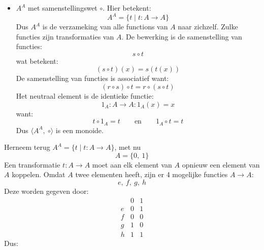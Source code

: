 \begin{itemize}
    \item $A^A$ met samenstellingswet $\circ$. Hier betekent:
    \begin{equation*}
        A^A = \{t \mid t : A \to A\}
    \end{equation*}
    Dus $A^A$ is de verzameking van alle functions van $A$ naar zichzelf. Zulke functies zijn transformaties van $A$. De bewerking is de samenstelling van functies:
    \begin{equation*}
        s \circ t
    \end{equation*}
    wat betekent:
    \begin{equation*}
        (s \circ t)(x) = s(t(x))
    \end{equation*}
    De samenstelling van functies is associatief want:
    \begin{equation*}
        (r \circ s) \circ t = r \circ (s \circ t)
    \end{equation*}
    Het neutraal element is de identieke functie:
    \begin{equation*}
        1_A : A \to A : 1_A(x) = x
    \end{equation*}
    want:
    \begin{equation*}
        t \circ 1_A = t \qquad \text{en} \qquad 1_A \circ t = t
    \end{equation*}
    Dus $\langle A^A,\ \circ \rangle$ is een monoide.
\end{itemize}

\textbf{} \newline
Herneem terug $A^A = \{t \mid t : A \to A\}$, met nu
\begin{equation*}
    A = \{0,\ 1\}
\end{equation*}
Een transformatie $t : A \to A$ moet aan elk element van $A$ opnieuw een element van $A$ koppelen. Omdat $A$ twee elementen heeft, zijn er 4 mogelijke functies $A \to A$:
\begin{equation*}
    e,\ f,\ g,\ h
\end{equation*}
Deze worden gegeven door:
\begin{equation*}
    \begin{array}{c|cc}
          & 0 & 1 \\
        \hline  
        e & 0 & 1 \\
        f & 0 & 0 \\
        g & 1 & 0 \\
        h & 1 & 1  
    \end{array}
\end{equation*}
Dus:

